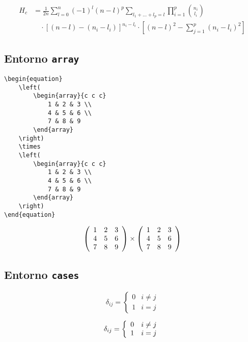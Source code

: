 \documentclass[12pt, a4paper]{article}
\begin{document}
\begin{equation}
    \begin{split}
        H_{c} & = \frac{1}{2n} \sum_{l=0}^{n} (-1)^{l} (n - l)^{p}
        \sum_{l_{1} + \dots + l_{p}=l} \prod_{i=1}^{p} \binom{n_i}{l_i} \\
              & \quad \cdot [(n-l) - (n_{i} - l_{i})]^{n_{i} - l_{i}}
        \cdot \left[(n - l)^{2} - \sum_{j=1}^{p} (n_{i} - l_{i})^2 \right]
    \end{split}
\end{equation}

\subsection{Entorno \texttt{array}}
\begin{verbatim}
\begin{equation}
    \left(
        \begin{array}{c c c}
            1 & 2 & 3 \\
            4 & 5 & 6 \\
            7 & 8 & 9
        \end{array}
    \right)
    \times
    \left(
        \begin{array}{c c c}
            1 & 2 & 3 \\
            4 & 5 & 6 \\
            7 & 8 & 9
        \end{array}
    \right) 
\end{equation}
\end{verbatim}

\begin{equation}
    \left(
        \begin{array}{c c c}
            1 & 2 & 3 \\
            4 & 5 & 6 \\
            7 & 8 & 9
        \end{array}
    \right)
    \times
    \left(
        \begin{array}{c c c}
            1 & 2 & 3 \\
            4 & 5 & 6 \\
            7 & 8 & 9
        \end{array}
    \right) 
\end{equation}

\subsection{Entorno \texttt{cases}}

\begin{equation}
    \delta_{ij} = \begin{cases}
    0 & i \neq j \\
    1 & i = j
    \end{cases}
\end{equation}

\begin{equation}
    \delta_{ij} = \left\{
    \begin{array}{c c}
        0 & i \neq j \\
        1 & i = j
    \end{array}
    \right.
\end{equation}
\end{document}
